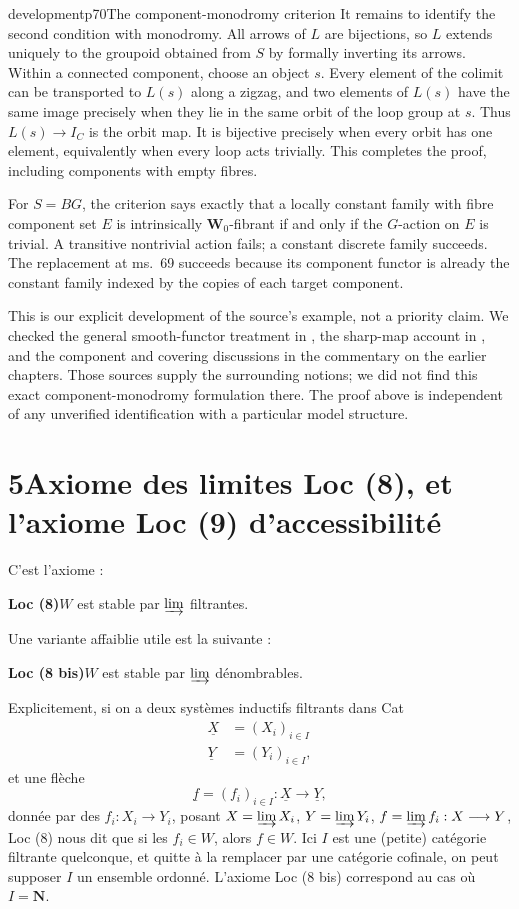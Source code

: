\begin{dcomment}{development}{p70}{The component-monodromy criterion}
It remains to identify the second condition with monodromy. All arrows of $L$ are bijections, so $L$ extends uniquely to the groupoid obtained from $S$ by formally inverting its arrows. Within a connected component, choose an object $s$. Every element of the colimit can be transported to $L(s)$ along a zigzag, and two elements of $L(s)$ have the same image precisely when they lie in the same orbit of the loop group at $s$. Thus $L(s)\to I_C$ is the orbit map. It is bijective precisely when every orbit has one element, equivalently when every loop acts trivially. This completes the proof, including components with empty fibres.

For $S=BG$, the criterion says exactly that a locally constant family with fibre component set $E$ is intrinsically $\mathbf W_0$-fibrant if and only if the $G$-action on $E$ is trivial. A transitive nontrivial action fails; a constant discrete family succeeds. The replacement at ms.~69 succeeds because its component functor is already the constant family indexed by the copies of each target component.

This is our explicit development of the source's example, not a priority claim. We checked the general smooth-functor treatment in \citet[Theorem~1.2]{Maltsiniotis2005Asphericite}, the sharp-map account in \citet[Section~2]{Rezk1998Sharp}, and the component and covering discussions in the commentary on the earlier chapters. Those sources supply the surrounding notions; we did not find this exact component-monodromy formulation there. The proof above is independent of any unverified identification with a particular model structure.
\end{dcomment}



\section*{5\quad Axiome des limites Loc (8), et l'axiome Loc (9) d'accessibilité}

C'est l'axiome :

\textbf{Loc (8)}\quad $W$ est stable par $\varinjlim$ filtrantes.

Une variante affaiblie utile est la suivante :

\textbf{Loc (8 bis)}\quad $W$ est stable par $\varinjlim$ dénombrables.

Explicitement, si on a deux systèmes inductifs filtrants dans Cat
\[
\begin{aligned}
\underline{X} &= (X_i)_{i\in I}\\
\underline{Y} &= (Y_i)_{i\in I},
\end{aligned}
\]
et une flèche
\[
\underline{f} = (f_i)_{i\in I} : \underline{X} \longrightarrow \underline{Y},
\]
donnée par des $f_i : X_i \longrightarrow Y_i$, posant $X = \varinjlim X_i$, $Y = \varinjlim Y_i$, $f = \varinjlim f_i : X \longrightarrow Y$, Loc (8) nous dit que si les $f_i \in W$, alors $f \in W$. Ici $I$ est
une (petite) catégorie filtrante quelconque, et quitte à la remplacer par une catégorie cofinale, on peut supposer $I$ un ensemble ordonné. L'axiome Loc (8 bis) correspond au cas où $I = \mathbf{N}$.

